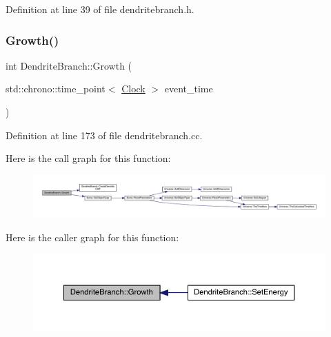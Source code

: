 Definition at line 39 of file dendritebranch.\+h.

\mbox{\label{class_dendrite_branch_a4b950ef8a0856a11240d353bcfd1fba4}} 
\subsubsection{\texorpdfstring{Growth()}{Growth()}}
{\footnotesize\ttfamily int Dendrite\+Branch\+::\+Growth (\begin{DoxyParamCaption}\item[{std\+::chrono\+::time\+\_\+point$<$ \hyperlink{universe_8h_a0ef8d951d1ca5ab3cfaf7ab4c7a6fd80}{Clock} $>$}]{event\+\_\+time }\end{DoxyParamCaption})}



Definition at line 173 of file dendritebranch.\+cc.

Here is the call graph for this function\+:
\nopagebreak
\begin{figure}[H]
\begin{center}
\leavevmode
\includegraphics[width=350pt]{class_dendrite_branch_a4b950ef8a0856a11240d353bcfd1fba4_cgraph}
\end{center}
\end{figure}
Here is the caller graph for this function\+:
\nopagebreak
\begin{figure}[H]
\begin{center}
\leavevmode
\includegraphics[width=350pt]{class_dendrite_branch_a4b950ef8a0856a11240d353bcfd1fba4_icgraph}
\end{center}
\end{figure}
\mbox{\label{class_dendrite_branch_afaca221cb4bba98e56f11b0f9e6370b5}} 
